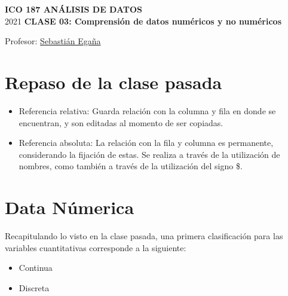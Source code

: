 \documentclass[12 pt,letterpaper]{article}
\begin{document}
%

	
	\pagestyle{fancy}
	\fancyhf{}
	\renewcommand{\headrulewidth}{0pt}
	\renewcommand{\footrulewidth}{0pt}	
	
\begin{center}
		
	\bigbreak
	\textbf{ICO 187 ANÁLISIS DE DATOS}\\
	\small{2021}
	\break
	\textbf{CLASE 03: Comprensión de datos numéricos y no numéricos}\\
\end{center}

\begin{flushright}	
		
	Profesor: \href{mailto:sebastianeganasa@santotomas.cl}{Sebastián Egaña}

\end{flushright}

\section{Repaso de la clase pasada}

\begin{itemize}
	\item Referencia relativa: Guarda relación con la columna y fila en donde se encuentran, y son editadas al momento de ser copiadas.
	
	\item Referencia absoluta: La relación con la fila y columna es permanente, considerando la fijación de estas. Se realiza a través de la utilización de nombres, como también a través de la utilización del signo \$.
\end{itemize}
	

\section{Data Númerica}

Recapitulando lo visto en la clase pasada, una primera clasificación para las variables cuantitativas corresponde a la siguiente: 

\begin{itemize}
	\item Continua
	\item Discreta
\end{itemize}
\end{document}
